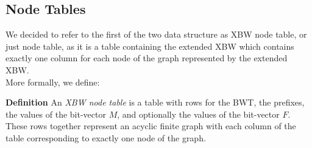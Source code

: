 \documentclass[a4paper,12pt,twoside,BCOR=10mm]{scrbook}
\begin{document}
\subsection{Node Tables}
\label{sec:node_table_definition}

We decided to refer to the first of the two data structure as XBW node table, or just node table,
as it is a
table containing the extended XBW which contains exactly one column for each
node of the graph represented by the extended XBW. \\
More formally, we define:

\textbf{Definition} An \textit{XBW node table}\label{def:node_table} is a table with rows for the BWT,
the prefixes, the values of the bit-vector $ M $, and optionally the values of the bit-vector $ F $.
These rows together represent an acyclic finite graph with each column of the table corresponding
to exactly one node of the graph.
\end{document}
